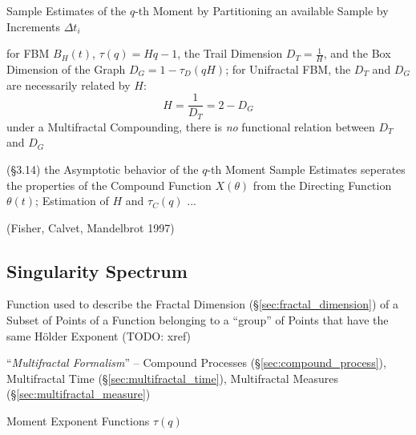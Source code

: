 Sample Estimates of the $q$-th Moment by Partitioning an available Sample by
Increments $\Delta t_i$

for FBM $B_H(t)$, $\tau(q) = Hq - 1$, the Trail Dimension $D_T = \frac{1}{H}$,
and the Box Dimension of the Graph $D_G = 1 - \tau_D(qH)$; for Unifractal FBM,
the $D_T$ and $D_G$ are necessarily related by $H$:
\[
  H = \frac{1}{D_T} = 2 - D_G
\]
under a Multifractal Compounding, there is \emph{no} functional relation between
$D_T$ and $D_G$

(\S 3.14) the Asymptotic behavior of the $q$-th Moment Sample Estimates
seperates the properties of the Compound Function $X(\theta)$ from the Directing
Function $\theta(t)$; Estimation of $H$ and $\tau_C(q)$ ...

(Fisher, Calvet, Mandelbrot 1997)



\subsection{Singularity Spectrum}\label{sec:singularity_spectrum}

Function used to describe the Fractal Dimension (\S\ref{sec:fractal_dimension})
of a Subset of Points of a Function belonging to a ``group'' of Points that have
the same H\"older Exponent (TODO: xref)

``\emph{Multifractal Formalism}'' -- Compound Processes
(\S\ref{sec:compound_process}), Multifractal Time
(\S\ref{sec:multifractal_time}), Multifractal Measures
(\S\ref{sec:multifractal_measure})

Moment Exponent Functions $\tau(q)$
